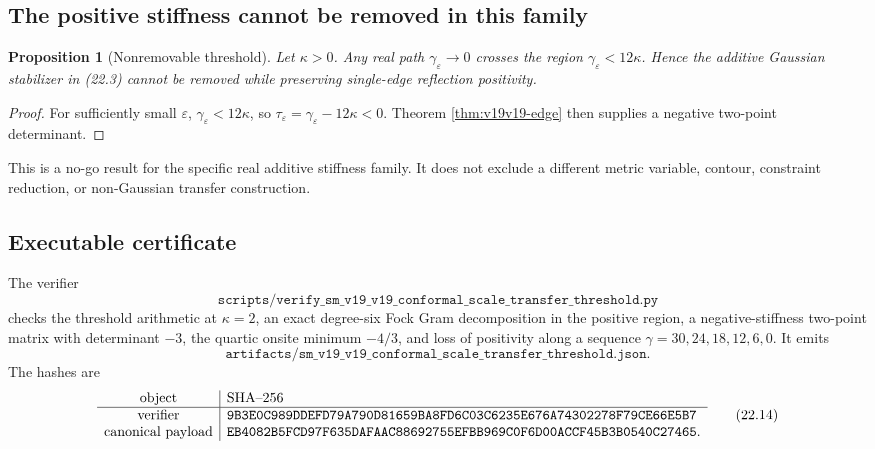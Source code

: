 \documentclass[11pt]{article}
\newtheorem{proposition}[theorem]{Proposition}
\theoremstyle{remark}
\begin{document}
\subsection{The positive stiffness cannot be removed in this family}

\begin{proposition}[Nonremovable threshold]
\label{prop:v19v19-nonremoval}
Let \(\kappa>0\).  Any real path \(\gamma_\varepsilon\to0\) crosses the
region \(\gamma_\varepsilon<12\kappa\).  Hence the additive Gaussian
stabilizer in (22.3) cannot be removed while preserving single-edge
reflection positivity.
\end{proposition}

\begin{proof}
For sufficiently small \(\varepsilon\),
\(\gamma_\varepsilon<12\kappa\), so
\(\tau_\varepsilon=\gamma_\varepsilon-12\kappa<0\).
Theorem \ref{thm:v19v19-edge} then supplies a negative two-point
determinant.
\end{proof}

This is a no-go result for the specific real additive stiffness family.
It does not exclude a different metric variable, contour, constraint
reduction, or non-Gaussian transfer construction.

\subsection{Executable certificate}

The verifier
\[
 \texttt{scripts/verify\_sm\_v19\_v19\_conformal\_scale\_transfer\_threshold.py}
                                                                  \tag{22.12}
\]
checks the threshold arithmetic at \(\kappa=2\), an exact degree-six Fock
Gram decomposition in the positive region, a negative-stiffness
two-point matrix with determinant \(-3\), the quartic onsite minimum
\(-4/3\), and loss of positivity along a sequence
\(\gamma=30,24,18,12,6,0\).  It emits
\[
 \texttt{artifacts/sm\_v19\_v19\_conformal\_scale\_transfer\_threshold.json}.
                                                                  \tag{22.13}
\]
The hashes are
\[
\begin{array}{c|l}
\hbox{object}&\hbox{SHA--256}\\ \hline
\hbox{verifier}&
\texttt{9B3E0C989DDEFD79A790D81659BA8FD6C03C6235E676A74302278F79CE66E5B7}\\
\hbox{canonical payload}&
\texttt{EB4082B5FCD97F635DAFAAC88692755EFBB969C0F6D00ACCF45B3B0540C27465}.
\end{array}                                                     \tag{22.14}
\]
\end{document}
